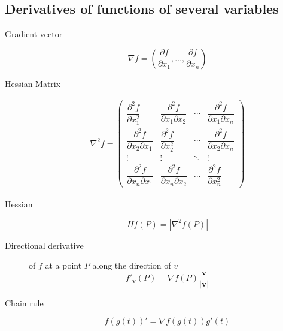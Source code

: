 \begin{multicols}{2}
\subsection*{Derivatives of functions of several variables}

	\begin{tcolorbox}[hbox, title=Partial derivatives]
		\begin{minipage}{0.4\textwidth}
			\flushleft
			\begin{description}
				\item[Gradient vector]
				\[
          \nabla f = \left(\frac{\partial f}{\partial x_1},\ldots, \frac{\partial f}{\partial x_n}\right)
        \]
				\item[Hessian Matrix]
				\[
          \begin{array}{c}
          \nabla^2f=
          \left(
          \begin{array}{cccc}
          \dfrac{\partial^2 f}{\partial x_1^2} & 
          \dfrac{\partial^2 f}{\partial x_1 \partial x_2} &
          \cdots &
          \dfrac{\partial^2 f}{\partial x_1 \partial x_n}\\
          \dfrac{\partial^2 f}{\partial x_2 \partial x_1} &
          \dfrac{\partial^2 f}{\partial x_2^2} & 
          \cdots &
          \dfrac{\partial^2 f}{\partial x_2 \partial x_n}\\
          \vdots & \vdots & \ddots & \vdots \\
          \dfrac{\partial^2 f}{\partial x_n \partial x_1} &
          \dfrac{\partial^2 f}{\partial x_n \partial x_2} &
          \cdots &
          \dfrac{\partial^2 f}{\partial x_n^2}
          \end{array}
          \right)
          \end{array}
        \]
				\item[Hessian] 
				\[
				  Hf(P)=|\nabla^2f(P)|
				\]
				\item[Directional derivative] of $f$ at a point $P$ along the direction of $v$
				\[
					f'_{\mathbf{v}}(P) = \nabla f(P)\frac{\mathbf{v}}{|\mathbf{v}|}
        \]
        \item[Chain rule] 
        \[
          f(g(t))' = \nabla f(g(t))g'(t)
        \]
			\end{description}
		\end{minipage}
	\end{tcolorbox}


\end{multicols}
